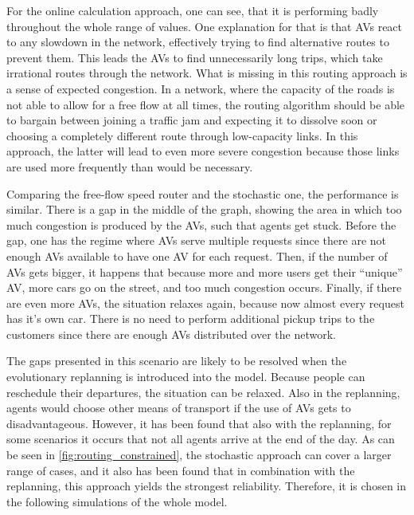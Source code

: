 For the online calculation approach, one can see, that it is performing badly
throughout the whole range of values. One explanation for that
is that AVs react to any slowdown in the network, effectively trying to find alternative
routes to prevent them. This leads the AVs to find unnecessarily long trips, which
take irrational routes through the network. What is missing in this routing approach
is a sense of expected congestion. In a network, where the capacity of the roads is
not able to allow for a free flow at all times, the routing algorithm should
be able to bargain between joining a traffic jam and expecting it to dissolve soon
or choosing a completely different route through low-capacity links. In this approach,
the latter will lead to even more severe congestion because those links are used
more frequently than would be necessary.

Comparing the free-flow speed router and the stochastic one, the performance is similar.
There is a gap in the middle of the graph, showing the area in which too much
congestion is produced by the AVs, such that agents get stuck. Before the gap,
one has the regime where AVs serve multiple requests
since there are not enough AVs available to have one AV for each request. Then,
if the number of AVs gets bigger, it happens that because more and more users get
their ``unique'' AV, more cars go on the street, and too much congestion occurs.
Finally, if there are even more AVs, the situation relaxes again, because now
almost every request has it's own car. There is no need to perform additional
pickup trips to the customers since there are enough AVs distributed over the
network.

The gaps presented in this scenario are likely to be resolved when the evolutionary
replanning is introduced into the model. Because people can reschedule
their departures, the situation can be relaxed. Also in the replanning, agents would
choose other means of transport if the use of AVs gets to disadvantageous. However,
it has been found that also with the replanning, for some scenarios it occurs that
not all agents arrive at the end of the day. As can be seen in \cref{fig:routing_constrained},
the stochastic approach can cover a larger range of cases, and it also has
been found that in combination with the replanning, this approach yields the strongest
reliability. Therefore, it is chosen in the following simulations of the whole
model.

